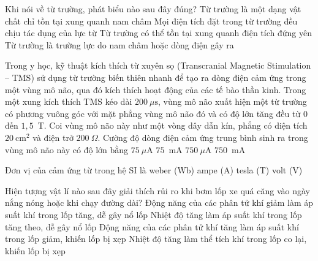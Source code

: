 	\begin{ex}%
		Khi nói về từ trường, phát biểu nào sau đây đúng?
		\choice
		{Từ trường là một dạng vật chất chỉ tồn tại xung quanh nam châm}
		{Mọi điện tích đặt trong từ trường đều chịu tác dụng của lực từ}
		{Từ trường có thể tồn tại xung quanh điện tích đứng yên}
		{\True Từ trường là trường lực do nam châm hoặc dòng điện gây ra}
	\end{ex}

	\begin{ex}%
		Trong y học, kỹ thuật kích thích từ xuyên sọ (Transcranial Magnetic Stimulation -- TMS) sử dụng từ trường biến thiên nhanh để tạo ra dòng điện cảm ứng trong một vùng mô não, qua đó kích thích hoạt động của các tế bào thần kinh. Trong một xung kích thích TMS kéo dài $200~\mu\text{s}$, vùng mô não xuất hiện một từ trường có phương vuông góc với mặt phẳng vùng mô não đó và có độ lớn tăng đều từ $0$ đến $1{,}5$~T. Coi vùng mô não này như một vòng dây dẫn kín, phẳng có diện tích $20~\text{cm}^2$ và điện trở $200~\Omega$. Cường độ dòng điện cảm ứng trung bình sinh ra trong vùng mô não này có độ lớn bằng
		\choice
		{$75~\mu\text{A}$}
		{\True $75$~mA}
		{$750~\mu\text{A}$}
		{$750$~mA}
	\end{ex}

	\begin{ex}%
		Đơn vị của cảm ứng từ trong hệ SI là
		\choice
		{weber (Wb)}
		{ampe (A)}
		{\True tesla (T)}
		{volt (V)}
	\end{ex}

	\begin{ex}%
		Hiện tượng vật lí nào sau đây giải thích rủi ro khi bơm lốp xe quá căng vào ngày nắng nóng hoặc khi chạy đường dài?
		\choice
		{Động năng của các phân tử khí giảm làm áp suất khí trong lốp tăng, dễ gây nổ lốp}
		{\True Nhiệt độ tăng làm áp suất khí trong lốp tăng theo, dễ gây nổ lốp}
		{Động năng của các phân tử khí tăng làm áp suất khí trong lốp giảm, khiến lốp bị xẹp}
		{Nhiệt độ tăng làm thể tích khí trong lốp co lại, khiến lốp bị xẹp}
	\end{ex}

